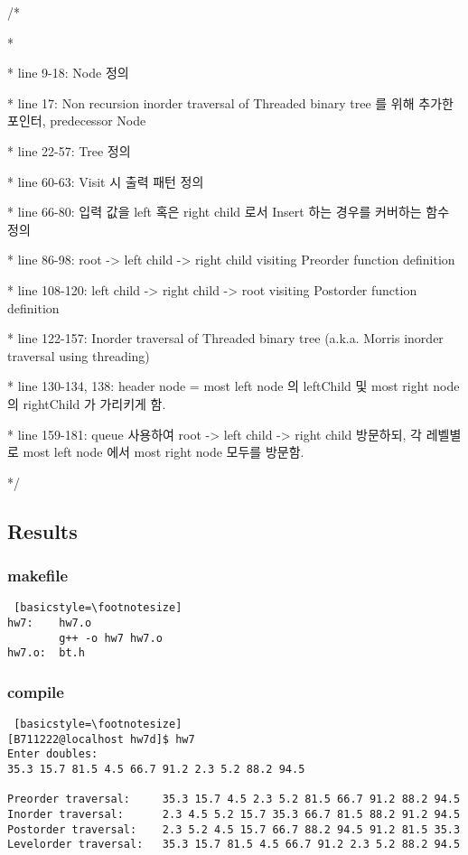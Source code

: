 \documentclass[twoside,twocolumn]{article}
\newenvironment{itemizeReduced}{
\begin{list}{\labelitemi}{\leftmargin=1em}
\setlength{\itemsep}{1pt}
\setlength{\parskip}{0pt}
\setlength{\parsep}{0pt}}{\end{list}
}
\begin{document}
\begin{itemizeReduced}
    \item[/*] 
    \item[*] 
    \item[*] line 9-18: Node 정의
    \item[*] line 17: Non recursion inorder traversal of Threaded binary tree 를 위해 추가한 포인터, predecessor Node
    \item[*] line 22-57: Tree 정의
    \item[*] line 60-63: Visit 시 출력 패턴 정의
    \item[*] line 66-80: 입력 값을 left 혹은 right child 로서 Insert 하는 경우를 커버하는 함수 정의
    \item[*] line 86-98: root -> left child -> right child visiting Preorder function definition
    \item[*] line 108-120: left child -> right child -> root visiting Postorder function definition
    \item[*] line 122-157: Inorder traversal of Threaded binary tree (a.k.a. Morris inorder traversal using threading)
    \item[*] line 130-134, 138: header node = most left node 의 leftChild 및 most right node 의 rightChild 가 가리키게 함.
    \item[*] line 159-181: queue 사용하여 root -> left child -> right child 방문하되, 각 레벨별로 most left  node 에서 most right node 모두를 방문함.
\end{itemizeReduced}
*/
\subsection{Results}
\subsubsection{makefile}
\begin{lstlisting} [basicstyle=\footnotesize]
hw7:    hw7.o
        g++ -o hw7 hw7.o
hw7.o:  bt.h
\end{lstlisting}

\subsubsection{compile}
\begin{lstlisting} [basicstyle=\footnotesize]
[B711222@localhost hw7d]$ hw7
Enter doubles:
35.3 15.7 81.5 4.5 66.7 91.2 2.3 5.2 88.2 94.5

Preorder traversal:     35.3 15.7 4.5 2.3 5.2 81.5 66.7 91.2 88.2 94.5
Inorder traversal:      2.3 4.5 5.2 15.7 35.3 66.7 81.5 88.2 91.2 94.5
Postorder traversal:    2.3 5.2 4.5 15.7 66.7 88.2 94.5 91.2 81.5 35.3
Levelorder traversal:   35.3 15.7 81.5 4.5 66.7 91.2 2.3 5.2 88.2 94.5
\end{lstlisting}
\end{document}
